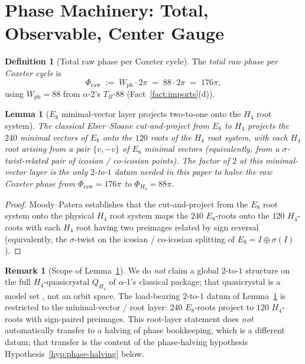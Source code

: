 \documentclass[11pt, a4paper]{amsart}
\newtheorem{lemma}[theorem]{Lemma}
\theoremstyle{definition}
\newtheorem{definition}[theorem]{Definition}
\newtheorem{remark}[theorem]{Remark}
\newcommand{\Wph}{W_{\mathrm{ph}}}
\newcommand{\Phiraw}{\Phi_{\mathrm{raw}}}
\newcommand{\PhiHfour}{\Phi_{H_4}}
\begin{document}
\section{Phase Machinery: Total, Observable, Center Gauge}
\label{sec:phase}

\begin{definition}[Total raw phase per Coxeter cycle]
\label{def:phi-raw}
The \emph{total raw phase per Coxeter cycle} is
\[
  \Phiraw \;:=\; \Wph \cdot 2\pi \;=\; 88 \cdot 2\pi
  \;=\; 176\pi,
\]
using $\Wph = 88$ from $\alpha$-2's $T_B$-$88$
(Fact~\ref{fact:imports}(d)).
\end{definition}

\begin{lemma}[$E_8$ minimal-vector layer projects two-to-one
  onto the $H_4$ root system]
\label{lem:E8-to-H4-2to1}
The classical Elser--Sloane cut-and-project from $E_8$ to
$H_4$ projects the $240$ minimal vectors of $E_8$ onto the
$120$ roots of the $H_4$ root system, with each $H_4$ root
arising from a pair $\{v, -v\}$ of $E_8$ minimal vectors
(equivalently, from a $\sigma$-twist-related pair of
icosian / co-icosian points). The factor of $2$ at this
\emph{minimal-vector layer} is the only $2$-to-$1$ datum
needed in this paper to halve the raw Coxeter phase from
$\Phiraw = 176\pi$ to $\PhiHfour = 88\pi$.
\end{lemma}

\begin{proof}
Moody--Patera \cite[Thm.~4.1, Prop.~4.2]{MoodyPatera}
establishes that the cut-and-project from the $E_8$ root
system onto the physical $H_4$ root system maps the $240$
$E_8$-roots onto the $120$ $H_4$-roots with each $H_4$ root
having two preimages related by sign reversal (equivalently,
the $\sigma$-twist on the icosian / co-icosian splitting of
$E_8 = I \oplus \sigma(I)$
\cite[Ch.~8]{ConwaySloane}).
\end{proof}

\begin{remark}[Scope of Lemma~\ref{lem:E8-to-H4-2to1}]
\label{rmk:2to1-scope}
We do \emph{not} claim a global $2$-to-$1$ structure on the
full $H_4$-quasicrystal $Q_{H_4}$ of $\alpha$-1's classical
package; that quasicrystal is a model set
\cite[Def.~def:cap]{Cascade12D}, not an orbit space. The
load-bearing $2$-to-$1$ datum of
Lemma~\ref{lem:E8-to-H4-2to1} is restricted to the
minimal-vector / root layer: $240$ $E_8$-roots project to $120$
$H_4$-roots with sign-paired preimages. This root-layer
statement does \emph{not} automatically transfer to a halving
of phase bookkeeping, which is a different datum; that
transfer is the content of the phase-halving hypothesis
Hypothesis~\ref{hyp:phase-halving} below.
\end{remark}
\end{document}
